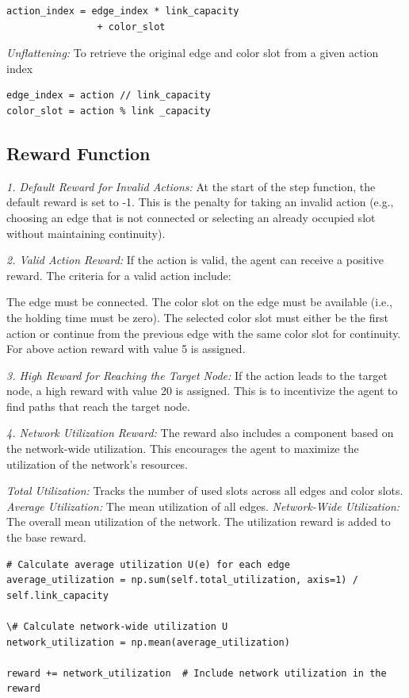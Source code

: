 \documentclass[conference]{IEEEtran}
\begin{document}
\begin{verbatim}
action_index = edge_index * link_capacity 
                + color_slot
\end{verbatim}

\noindent\textit{Unflattening:} To retrieve the original edge and color slot from a given action index

\begin{verbatim}
edge_index = action // link_capacity
color_slot = action % link _capacity
\end{verbatim}


\subsection{\textbf{Reward Function}}

\noindent\textit{1. Default Reward for Invalid Actions:}
At the start of the step function, the default reward is set to -1. This is the penalty for taking an invalid action (e.g., choosing an edge that is not connected or selecting an already occupied slot without maintaining continuity).

\noindent\textit{2. Valid Action Reward:}
If the action is valid, the agent can receive a positive reward. The criteria for a valid action include:

The edge must be connected.
The color slot on the edge must be available (i.e., the holding time must be zero).
The selected color slot must either be the first action or continue from the previous edge with the same color slot for continuity.
For above action reward with value 5 is assigned.

\noindent\textit{3. High Reward for Reaching the Target Node:}
If the action leads to the target node, a high reward with value 20 is assigned. This is to incentivize the agent to find paths that reach the target node.

\noindent\textit{4. Network Utilization Reward:}
The reward also includes a component based on the network-wide utilization. This encourages the agent to maximize the utilization of the network's resources.

\textit{Total Utilization:} Tracks the number of used slots across all edges and color slots.
\textit{Average Utilization:} The mean utilization of all edges.
\textit{Network-Wide Utilization:} The overall mean utilization of the network.
The utilization reward is added to the base reward.

\begin{tiny}
\begin{verbatim}
# Calculate average utilization U(e) for each edge
average_utilization = np.sum(self.total_utilization, axis=1) / self.link_capacity

\# Calculate network-wide utilization U
network_utilization = np.mean(average_utilization)

reward += network_utilization  # Include network utilization in the reward

\end{verbatim}
\end{tiny}
\end{document}
